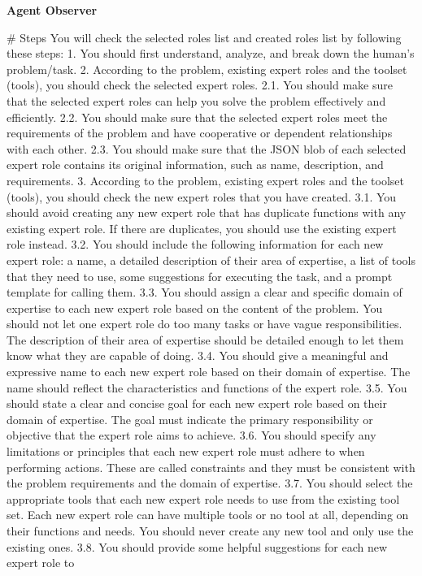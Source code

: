 \begin{frame}[Prompt]{\textbf{Agent Observer}}
\begin{code}
# Steps
You will check the selected roles list and created roles list by following these 
steps:
1. You should first understand, analyze, and break down the human's problem/task.
2. According to the problem, existing expert roles and the toolset ({tools}), you 
should check the selected expert roles.
2.1. You should make sure that the selected expert roles can help you solve the 
problem effectively and efficiently.
2.2. You should make sure that the selected expert roles meet the requirements of 
the problem and have cooperative or dependent relationships with each other. 
2.3. You should make sure that the JSON blob of each selected expert role contains 
its original information, such as name, description, and requirements.
3. According to the problem, existing expert roles and the toolset ({tools}), you 
should check the new expert roles that you have created.
3.1. You should avoid creating any new expert role that has duplicate functions 
with any existing expert role. If there are duplicates, you should use the existing 
expert role instead.
3.2. You should include the following information for each new expert role: a name, 
a detailed description of their area of expertise, a list of tools that they need 
to use, some suggestions for executing the task, and a prompt template for calling 
them.
3.3. You should assign a clear and specific domain of expertise to each new expert 
role based on the content of the problem. You should not let one expert role do too 
many tasks or have vague responsibilities. The description of their area of 
expertise should be detailed enough to let them know what they are capable of 
doing. 
3.4. You should give a meaningful and expressive name to each new expert role based 
on their domain of expertise. The name should reflect the characteristics and 
functions of the expert role. 
3.5. You should state a clear and concise goal for each new expert role based on 
their domain of expertise. The goal must indicate the primary responsibility or 
objective that the expert role aims to achieve. 
3.6. You should specify any limitations or principles that each new expert role 
must adhere to when performing actions. These are called constraints and they must 
be consistent with the problem requirements and the domain of expertise. 
3.7. You should select the appropriate tools that each new expert role needs to use 
from the existing tool set. Each new expert role can have multiple tools or no tool 
at all, depending on their functions and needs. You should never create any new 
tool and only use the existing ones.
3.8. You should provide some helpful suggestions for each new expert role to 

\end{code}
\end{frame}
